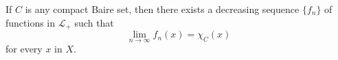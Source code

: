 If $C$ is any compact Baire set, then there exists a decreasing sequence $\{f_n\}$ of functions in $\mathcal{L}_+$ such that
$$\lim_{n \to \infty} f_n(x) = \chi_C(x)$$
for every $x$ in $X$.
